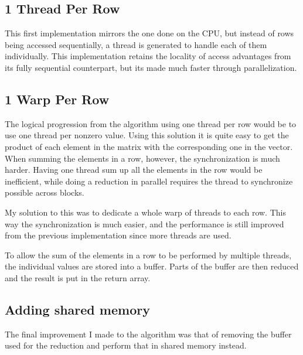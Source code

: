 \documentclass{article}
\begin{document}
\subsection{1 Thread Per Row}
This first implementation mirrors the one done on the CPU, but instead of rows being accessed sequentially, a thread is generated to handle each of them individually.
This implementation retains the locality of access advantages from its fully sequential counterpart, but its made much faster through parallelization.

\subsection{1 Warp Per Row}
The logical progression from the algorithm using one thread per row would be to use one thread per nonzero value. Using this solution it is quite easy to get the product of each element in the matrix with the corresponding one in the vector.\\
When summing the elements in a row, however, the synchronization is much harder. Having one thread sum up all the elements in the row would be inefficient, while doing a reduction in parallel requires the thread to synchronize possible across blocks.

My solution to this was to dedicate a whole warp of threads to each row. This way the synchronization is much easier, and the performance is still improved from the previous implementation since more threads are used.

To allow the sum of the elements in a row to be performed by multiple threads, the individual values are stored into a buffer. Parts of the buffer are then reduced and the result is put in the return array.

\subsection{Adding shared memory}
The final improvement I made to the algorithm was that of removing the buffer used for the reduction and perform that in shared memory instead.
\end{document}
